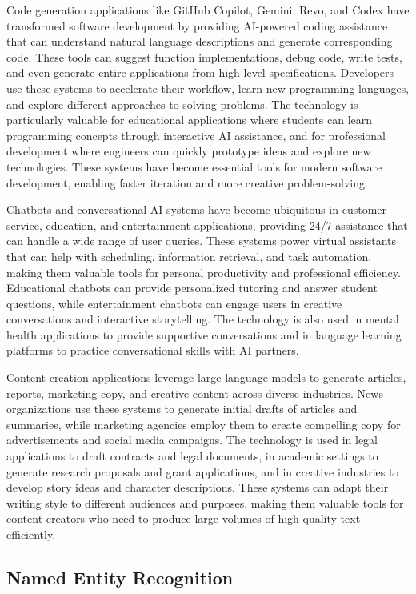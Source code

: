 Code generation applications like GitHub Copilot, Gemini, Revo, and Codex have transformed software development by providing AI-powered coding assistance that can understand natural language descriptions and generate corresponding code. These tools can suggest function implementations, debug code, write tests, and even generate entire applications from high-level specifications. Developers use these systems to accelerate their workflow, learn new programming languages, and explore different approaches to solving problems. The technology is particularly valuable for educational applications where students can learn programming concepts through interactive AI assistance, and for professional development where engineers can quickly prototype ideas and explore new technologies. These systems have become essential tools for modern software development, enabling faster iteration and more creative problem-solving.

Chatbots and conversational AI systems have become ubiquitous in customer service, education, and entertainment applications, providing 24/7 assistance that can handle a wide range of user queries. These systems power virtual assistants that can help with scheduling, information retrieval, and task automation, making them valuable tools for personal productivity and professional efficiency. Educational chatbots can provide personalized tutoring and answer student questions, while entertainment chatbots can engage users in creative conversations and interactive storytelling. The technology is also used in mental health applications to provide supportive conversations and in language learning platforms to practice conversational skills with AI partners.

Content creation applications leverage large language models to generate articles, reports, marketing copy, and creative content across diverse industries. News organizations use these systems to generate initial drafts of articles and summaries, while marketing agencies employ them to create compelling copy for advertisements and social media campaigns. The technology is used in legal applications to draft contracts and legal documents, in academic settings to generate research proposals and grant applications, and in creative industries to develop story ideas and character descriptions. These systems can adapt their writing style to different audiences and purposes, making them valuable tools for content creators who need to produce large volumes of high-quality text efficiently.

\subsection{Named Entity Recognition}

